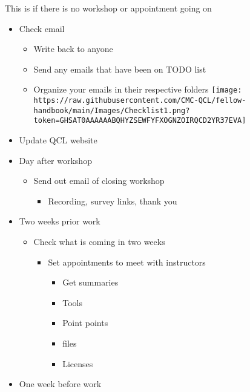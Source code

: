 \documentclass[
]{book}
\providecommand{\tightlist}{%
  \setlength{\itemsep}{0pt}\setlength{\parskip}{0pt}}
\begin{document}
This is if there is no workshop or appointment going on

\begin{itemize}
\tightlist
\item
  Check email

  \begin{itemize}
  \tightlist
  \item
    Write back to anyone
  \item
    Send any emails that have been on TODO list
  \item
    Organize your emails in their respective folders
    \texttt{[image: https://raw.githubusercontent.com/CMC-QCL/fellow-handbook/main/Images/Checklist1.png?token=GHSAT0AAAAAABQHYZSEWFYFXOGNZOIRQCD2YR37EVA]}
  \end{itemize}
\item
  Update QCL website
\item
  Day after workshop

  \begin{itemize}
  \tightlist
  \item
    Send out email of closing workshop

    \begin{itemize}
    \tightlist
    \item
      Recording, survey links, thank you
    \end{itemize}
  \end{itemize}
\item
  Two weeks prior work

  \begin{itemize}
  \tightlist
  \item
    Check what is coming in two weeks

    \begin{itemize}
    \tightlist
    \item
      Set appointments to meet with instructors

      \begin{itemize}
      \tightlist
      \item
        Get summaries
      \item
        Tools
      \item
        Point points
      \item
        files
      \item
        Licenses
      \end{itemize}
    \end{itemize}
  \end{itemize}
\item
  One week before work


\end{itemize}
\end{document}
